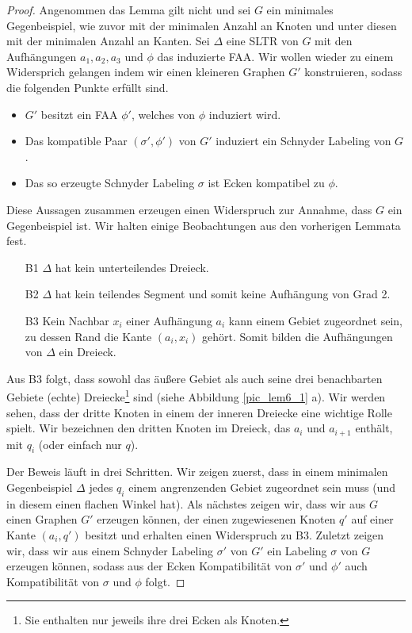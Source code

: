 \begin{proof}
Angenommen das Lemma gilt nicht und sei $G$ ein minimales Gegenbeispiel, wie zuvor mit der minimalen Anzahl an Knoten und unter diesen mit der minimalen Anzahl an Kanten. Sei $\Delta$ eine SLTR von $G$ mit den Aufhängungen $a_1,a_2,a_3$ und $\phi$ das induzierte FAA. Wir wollen wieder zu einem Widersprich gelangen indem wir einen kleineren Graphen $G'$ konstruieren, sodass die folgenden Punkte erfüllt sind.
\begin{itemize}
\item $G'$ besitzt ein FAA $\phi'$, welches von $\phi$ induziert wird.
\item Das kompatible Paar $(\sigma',\phi')$ von $G'$ induziert ein Schnyder Labeling von $G$.
\item Das so erzeugte Schnyder Labeling $\sigma$ ist Ecken kompatibel zu $\phi$.
\end{itemize}
Diese Aussagen zusammen erzeugen einen Widerspruch zur Annahme, dass $G$ ein Gegenbeispiel ist. Wir halten einige Beobachtungen aus den vorherigen Lemmata fest.
\begin{itemize}
\item [B1] $\Delta$ hat kein unterteilendes Dreieck.
\item [B2] $\Delta$ hat kein teilendes Segment und somit keine Aufhängung von Grad 2.
\item [B3] Kein Nachbar $x_i$ einer Aufhängung $a_i$ kann einem Gebiet zugeordnet sein, zu dessen Rand die Kante $(a_i,x_i)$ gehört. Somit bilden die Aufhängungen von $\Delta$ ein Dreieck.
\end{itemize}

Aus B3 folgt, dass sowohl das äußere Gebiet als auch seine drei benachbarten Gebiete (echte) Dreiecke\footnote{Sie enthalten nur jeweils ihre drei Ecken als Knoten.} sind (siehe Abbildung \ref{pic_lem6_1} a). Wir werden sehen, dass der dritte Knoten in einem der inneren Dreiecke eine wichtige Rolle spielt. Wir bezeichnen den dritten Knoten im Dreieck, das $a_i$ und $a_{i+1}$ enthält, mit $q_i$ (oder einfach nur $q$).

Der Beweis läuft in drei Schritten. Wir zeigen zuerst, dass in einem minimalen Gegenbeispiel $\Delta$ jedes $q_i$ einem angrenzenden Gebiet zugeordnet sein muss (und in diesem einen flachen Winkel hat). Als nächstes zeigen wir, dass wir aus $G$ einen Graphen $G'$ erzeugen können, der einen zugewiesenen Knoten $q'$ auf einer Kante $(a_i,q')$ besitzt und erhalten einen Widerspruch zu B3. Zuletzt zeigen wir, dass wir aus einem Schnyder Labeling $\sigma'$ von $G'$ ein Labeling $\sigma$ von $G$ erzeugen können, sodass aus der Ecken Kompatibilität von $\sigma'$ und $\phi'$ auch Kompatibilität von $\sigma$ und $\phi$ folgt.


\end{proof}
